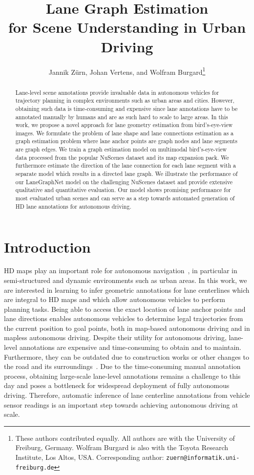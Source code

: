 \documentclass[letterpaper, 10 pt, conference]{ieeeconf}
\title{\LARGE \bf
Lane Graph Estimation \\ for Scene Understanding in Urban Driving}
\author{Jannik Z\"urn, Johan Vertens, and Wolfram Burgard\thanks{These authors contributed equally. All authors are with the University of Freiburg, Germany. Wolfram
Burgard is also with the Toyota Research Institute, Los Altos, USA. Corresponding author: {\tt\small zuern@informatik.uni-freiburg.de}}}
\begin{document}
\maketitle



\thispagestyle{empty}
\pagestyle{empty}



\begin{abstract}
    Lane-level scene annotations provide invaluable data in autonomous vehicles for trajectory planning in complex environments such as urban areas and cities. However, obtaining such data is time-consuming and expensive since lane annotations have to be annotated manually by humans and are as such hard to scale to large areas. In this work, we propose a novel approach for lane geometry estimation from bird's-eye-view images. We formulate the problem of lane shape and lane connections estimation as a graph estimation problem where lane anchor points are graph nodes and lane segments are graph edges. We train a graph estimation model on multimodal bird's-eye-view data processed from the popular NuScenes dataset and its map expansion pack. We furthermore estimate the direction of the lane connection for each lane segment with a separate model which results in a directed lane graph. We illustrate the performance of our LaneGraphNet model on the challenging NuScenes dataset and provide extensive qualitative and quantitative evaluation. Our model shows promising performance for most evaluated urban scenes and can serve as a step towards automated generation of HD lane annotations for autonomous driving.
   \end{abstract}




\section{Introduction}
\label{sec:introduction}

HD maps play an important role for autonomous navigation~\cite{pannen2020keep, kim2021hd}, in particular in semi-structured and dynamic environments such as urban areas. In this work, we are interested in learning to infer geometric annotations for lane centerlines which are integral to HD maps and which allow autonomous vehicles to perform planning tasks. Being able to access the exact location of lane anchor points and lane directions enables autonomous vehicles to determine legal trajectories from the current position to goal points, both in map-based autonomous driving and in mapless autonomous driving. Despite their utility for autonomous driving, lane-level annotations are expensive and time-consuming to obtain and to maintain. Furthermore, they can be outdated due to construction works or other changes to the road and its surroundings~\cite{pannen2020keep}. Due to the time-consuming manual annotation process, obtaining large-scale lane-level annotations remains a challenge to this day and poses a bottleneck for widespread deployment of fully autonomous driving. Therefore, automatic inference of lane centerline annotations from vehicle sensor readings is an important step towards achieving autonomous driving at scale.
\end{document}
